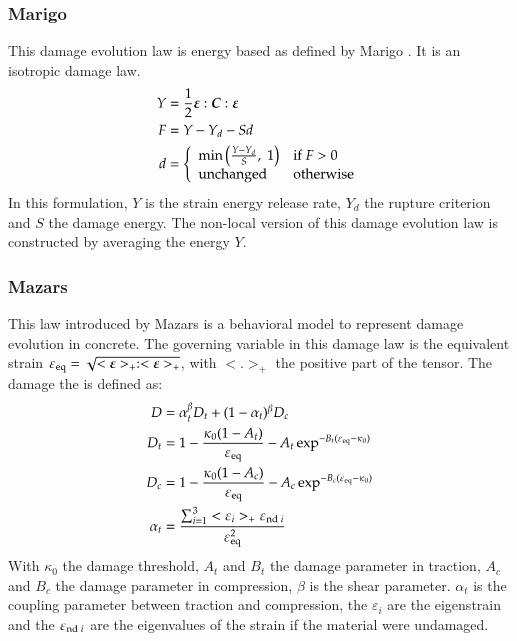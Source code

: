 \subsubsection{Marigo}
This damage evolution law is energy based as defined by Marigo \cite{marigo81a,
  lemaitre96a}. It is an isotropic damage law.
\begin{align}
  Y &= \frac{1}{2}\boldsymbol{\varepsilon}:\boldsymbol{C}:\boldsymbol{\varepsilon}\\
  F &= Y - Y_d - S d\\
  d &= \left\{
    \begin{array}{l l}
      \mathrm{min}\left(\frac{Y-Y_d}{S},\;1\right) & \mathrm{if}\; F > 0\\
      \mathrm{unchanged} & \mathrm{otherwise}
    \end{array}
  \right.
\end{align}
In this formulation, $Y$ is the strain energy release rate, $Y_d$ the
rupture criterion and $S$ the damage energy.  The non-local version of
this damage evolution law is constructed by averaging the energy $Y$.

\subsubsection{Mazars}
This law introduced by Mazars \cite{mazars84a} is a behavioral model to
represent damage evolution in concrete. The governing variable in this damage
law is the equivalent strain $\varepsilon_{{\mathrm{eq}}} =
\sqrt{<\boldsymbol{\varepsilon}>_+:<\boldsymbol{\varepsilon}>_+}$, with $<.>_+$ the positive
part of the tensor.
The damage the is defined as:
\begin{align}
  D &= \alpha_t^\beta D_t + (1-\alpha_t)^\beta D_c\\
  D_t &= 1 - \frac{\kappa_0 (1- A_t)}{\varepsilon_{{\mathrm{eq}}}} - A_t \exp^{-B_t(\varepsilon_{{\mathrm{eq}}}-\kappa_0)}\\
  D_c &= 1 - \frac{\kappa_0 (1- A_c)}{\varepsilon_{{\mathrm{eq}}}} - A_c
  \exp^{-B_c(\varepsilon_{{\mathrm{eq}}}-\kappa_0)}\\
  \alpha_t &= \frac{\sum_{i=1}^3<\varepsilon_i>_+\varepsilon_{{\mathrm{nd}}\;i}}{\varepsilon_{{\mathrm{eq}}}^2}
\end{align}
With $\kappa_0$ the damage threshold, $A_t$ and $B_t$ the damage parameter in
traction, $A_c$ and $B_c$ the damage parameter in compression, $\beta$ is the
shear parameter. $\alpha_t$ is the coupling parameter between traction and
compression, the $\varepsilon_i$ are the eigenstrain and the
$\varepsilon_{{\mathrm{nd}}\;i}$ are the eigenvalues of the strain if the material
were undamaged.


